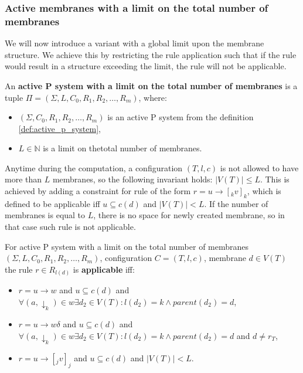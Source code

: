 \subsubsection{Active membranes with a limit on the total number of membranes} %
\label{ssub:active_membranes_with_a_limit_on_total_number_of_membranes}

We will now introduce a variant with a global limit upon the membrane structure. We achieve this by restricting the rule application such that if the rule would result in a structure exceeding the limit, the rule will not be applicable.

\begin{definition}
  \label{def:active_p_system_with_a_limit_on_total_number_of_membranes}
  An {\bf active P system with a limit on the total number of membranes} is a tuple $\Pi = (\Sigma, L, C_0, R_1, R_2, \ldots, R_m)$, where:
  \begin{itemize}
    \item $(\Sigma, C_0, R_1, R_2, \ldots, R_m)$ is an active P system from the definition \ref{def:active_p_system},
    \item $L\in \mathbb N$ is a limit on thetotal number of membranes.
  \end{itemize}
\end{definition}
Anytime during the computation, a configuration $(T, l, c)$ is not allowed to have more than $L$ membranes, so the following invariant holds: $|V(T)|\leq L$.
This is achieved by adding a constraint for rule of the form $r = u\rightarrow [_k v]_k$, which is defined to be applicable iff $u\subseteq c(d)$ and $|V(T)|<L$. If the number of membranes is equal to $L$, there is no space for newly created membrane, so in that case such rule is not applicable.

\begin{definition}
  \label{def:applicable_rule_of_active_p_system_with_a_limit_on_total_number_of_membranes}
  For active P system with a limit on the total number of membranes $(\Sigma, L, C_0, R_1, R_2, \ldots, R_m)$, configuration $C = (T, l, c)$, membrane $d\in V(T)$ the rule $r\in R_{l(d)}$ is {\bf applicable} iff:
  \begin{itemize}
    \item $r = u\rightarrow w$ and $u\subseteq c(d)$ and $\forall (a,\downarrow_k)\in w \exists d_2\in V(T): l(d_2)=k \wedge parent(d_2) = d$,
    \item $r = u\rightarrow w\delta$ and $u\subseteq c(d)$ and $\forall (a,\downarrow_k)\in w \exists d_2\in V(T): l(d_2)=k \wedge parent(d_2) = d$ and $d\neq r_T$,
    \item $r = u\rightarrow [_j v]_j$ and $u\subseteq c(d)$ and $|V(T)|<L$.
  \end{itemize}
\end{definition}


